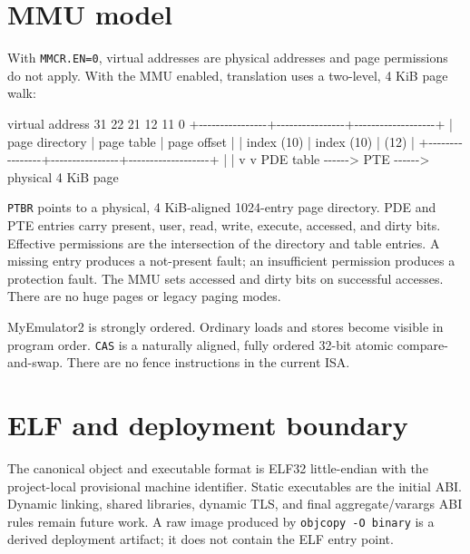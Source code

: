 \documentclass[
  oneside,
  openany]{book}
\newenvironment{Shaded}{\begin{snugshade}}{\end{snugshade}}
\newcommand{\NormalTok}[1]{#1}
\begin{document}
\hypertarget{mmu-model}{%
\section{MMU model}\label{mmu-model}}

With \texttt{MMCR.EN=0}, virtual addresses are physical addresses and
page permissions do not apply. With the MMU enabled, translation uses a
two-level, 4 KiB page walk:

\begin{Shaded}
\begin{Highlighting}[]
\NormalTok{virtual address}
\NormalTok{31             22 21             12 11                0}
\NormalTok{+{-}{-}{-}{-}{-}{-}{-}{-}{-}{-}{-}{-}{-}{-}{-}{-}+{-}{-}{-}{-}{-}{-}{-}{-}{-}{-}{-}{-}{-}{-}{-}{-}+{-}{-}{-}{-}{-}{-}{-}{-}{-}{-}{-}{-}{-}{-}{-}{-}{-}{-}{-}+}
\NormalTok{| page directory | page table     | page offset       |}
\NormalTok{| index (10)     | index (10)     | (12)              |}
\NormalTok{+{-}{-}{-}{-}{-}{-}{-}{-}{-}{-}{-}{-}{-}{-}{-}{-}+{-}{-}{-}{-}{-}{-}{-}{-}{-}{-}{-}{-}{-}{-}{-}{-}+{-}{-}{-}{-}{-}{-}{-}{-}{-}{-}{-}{-}{-}{-}{-}{-}{-}{-}{-}+}
\NormalTok{        |                |}
\NormalTok{        v                v}
\NormalTok{     PDE table  {-}{-}{-}{-}{-}{-}\textgreater{} PTE {-}{-}{-}{-}{-}{-}\textgreater{} physical 4 KiB page}
\end{Highlighting}
\end{Shaded}

\texttt{PTBR} points to a physical, 4 KiB-aligned 1024-entry page
directory. PDE and PTE entries carry present, user, read, write,
execute, accessed, and dirty bits. Effective permissions are the
intersection of the directory and table entries. A missing entry
produces a not-present fault; an insufficient permission produces a
protection fault. The MMU sets accessed and dirty bits on successful
accesses. There are no huge pages or legacy paging modes.

MyEmulator2 is strongly ordered. Ordinary loads and stores become
visible in program order. \texttt{CAS} is a naturally aligned, fully
ordered 32-bit atomic compare-and-swap. There are no fence instructions
in the current ISA.

\hypertarget{elf-and-deployment-boundary}{%
\section{ELF and deployment
boundary}\label{elf-and-deployment-boundary}}

The canonical object and executable format is ELF32 little-endian with
the project-local provisional machine identifier. Static executables are
the initial ABI. Dynamic linking, shared libraries, dynamic TLS, and
final aggregate/varargs ABI rules remain future work. A raw image
produced by \texttt{objcopy\ -O\ binary} is a derived deployment
artifact; it does not contain the ELF entry point.
\end{document}
